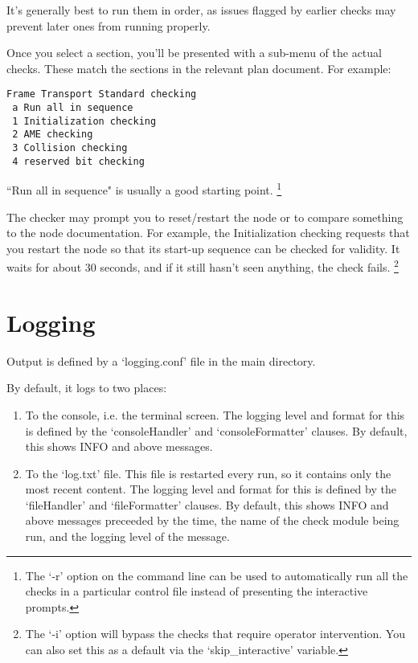 It's generally best to run them in order, as issues flagged by earlier
checks may prevent later ones from running properly.

Once you select a section, you'll be presented with a sub-menu of the
actual checks.  These match the sections in the relevant plan document.
For example:

\begin{verbatim}
Frame Transport Standard checking
 a Run all in sequence
 1 Initialization checking
 2 AME checking
 3 Collision checking
 4 reserved bit checking
\end{verbatim}

``Run all in sequence" is usually a good starting point.
\footnote{
    The `-r' option on the command line can be used to 
    automatically run all the checks in a particular
    control file instead of presenting the interactive prompts.
}

The checker may prompt you to reset/restart the node or to
compare something to the node documentation. For example,
the Initialization checking requests that you restart the node
so that its start-up sequence can be checked for validity.
It waits for about 30 seconds, and if it still hasn't seen anything, the
check fails.
\footnote{The `-i' option will bypass the
checks that require operator intervention.  
You can also set this as a default via the `skip\_interactive' variable.
}

\section{Logging}

Output is defined by a `logging.conf' file in the main directory.

By default, it logs to two places:
\begin{enumerate}
\item To the console, i.e. the terminal screen.  The logging level and format
for this is defined by the `consoleHandler' and `consoleFormatter' clauses.
By default, this shows INFO and above messages.
\item To the `log.txt' file. This file is restarted every run, so it 
contains only the most recent content. The logging level and format
for this is defined by the `fileHandler' and `fileFormatter' clauses.
By default, this shows INFO and above messages preceeded by the 
time, the name of the check module being run, and the logging level of the message.
\end{enumerate}

